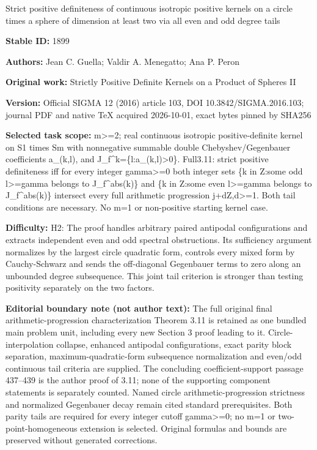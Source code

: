 \documentclass[11pt]{article}
\numberwithin{equation}{section}
\begin{document}
\begin{center}\Large Strict positive definiteness of continuous isotropic positive kernels on a circle times a sphere of dimension at least two via all even and odd degree tails\end{center}
\noindent\textbf{Stable ID:} 1899\par
\noindent\textbf{Authors:} Jean C. Guella; Valdir A. Menegatto; Ana P. Peron\par
\noindent\textbf{Original work:} Strictly Positive Definite Kernels on a Product of Spheres II\par
\noindent\textbf{Version:} Official SIGMA 12 (2016) article 103, DOI 10.3842/SIGMA.2016.103; journal PDF and native TeX acquired 2026-10-01, exact bytes pinned by SHA256\par
\noindent\textbf{Selected task scope:} m>=\allowbreak{}2; real continuous isotropic positive-definite kernel on S1 times Sm with nonnegative summable double Chebyshev/Gegenbauer coefficients a\_(k,l), and J\_f\textasciicircum{}k=\allowbreak{}\{l:a\_(k,l)>0\}. Full3.11: strict positive definiteness iff for every integer gamma>=\allowbreak{}0 both integer sets \{k in Z:some odd l>=\allowbreak{}gamma belongs to J\_f\textasciicircum{}abs(k)\} and \{k in Z:some even l>=\allowbreak{}gamma belongs to J\_f\textasciicircum{}abs(k)\} intersect every full arithmetic progression j+\allowbreak{}dZ,d>=\allowbreak{}1. Both tail conditions are necessary. No m=\allowbreak{}1 or non-positive starting kernel case.\par
\noindent\textbf{Difficulty:} H2: The proof handles arbitrary paired antipodal configurations and extracts independent even and odd spectral obstructions. Its sufficiency argument normalizes by the largest circle quadratic form, controls every mixed form by Cauchy-Schwarz and sends the off-diagonal Gegenbauer terms to zero along an unbounded degree subsequence. This joint tail criterion is stronger than testing positivity separately on the two factors.\par
\noindent\textbf{Editorial boundary note (not author text):} The full original final arithmetic-progression characterization Theorem 3.11 is retained as one bundled main problem unit, including every new Section 3 proof leading to it. Circle-interpolation collapse, enhanced antipodal configurations, exact parity block separation, maximum-quadratic-form subsequence normalization and even/odd continuous tail criteria are supplied. The concluding coefficient-support passage 437–439 is the author proof of 3.11; none of the supporting component statements is separately counted. Named circle arithmetic-progression strictness and normalized Gegenbauer decay remain cited standard prerequisites. Both parity tails are required for every integer cutoff gamma>=\allowbreak{}0; no m=\allowbreak{}1 or two-point-homogeneous extension is selected. Original formulas and bounds are preserved without generated corrections.\par
\end{document}
